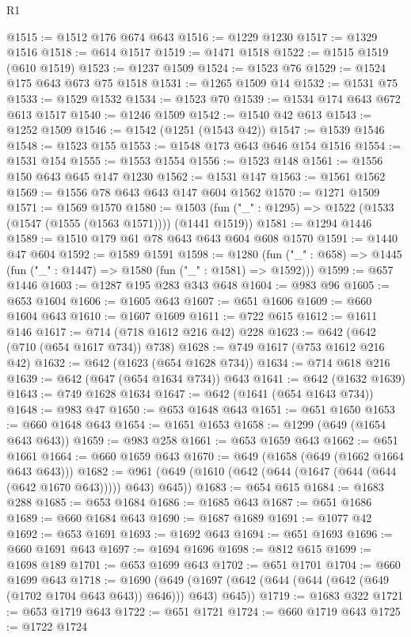 \begin{lexlean}{R1}
\begin{coremodule}
@1515 := @1512 @176 @674 @643
@1516 := @1229 @1230
@1517 := @1329 @1516
@1518 := @614 @1517
@1519 := @1471 @1518
@1522 := @1515 @1519 (@610 @1519)
@1523 := @1237 @1509
@1524 := @1523 @76
@1529 := @1524 @175 @643 @673 @75 @1518
@1531 := @1265 @1509 @14
@1532 := @1531 @75
@1533 := @1529 @1532
@1534 := @1523 @70
@1539 := @1534 @174 @643 @672 @613 @1517
@1540 := @1246 @1509
@1542 := @1540 @42 @613
@1543 := @1252 @1509
@1546 := @1542 (@1251 (@1543 @42))
@1547 := @1539 @1546
@1548 := @1523 @155
@1553 := @1548 @173 @643 @646 @154 @1516
@1554 := @1531 @154
@1555 := @1553 @1554
@1556 := @1523 @148
@1561 := @1556 @150 @643 @645 @147 @1230
@1562 := @1531 @147
@1563 := @1561 @1562
@1569 := @1556 @78 @643 @643 @147 @604 @1562
@1570 := @1271 @1509
@1571 := @1569 @1570
@1580 := @1503 (fun ("_" : @1295) => @1522 (@1533 (@1547 (@1555 (@1563 @1571)))) (@1441 @1519))
@1581 := @1294 @1446
@1589 := @1510 @179 @61 @78 @643 @643 @604 @608 @1570
@1591 := @1440 @47 @604
@1592 := @1589 @1591
@1598 := @1280 (fun ("_" : @658) => @1445 (fun ("_" : @1447) => @1580 (fun ("_" : @1581) => @1592)))
@1599 := @657 @1446
@1603 := @1287 @195 @283 @343 @648
@1604 := @983 @96
@1605 := @653 @1604
@1606 := @1605 @643
@1607 := @651 @1606
@1609 := @660 @1604 @643
@1610 := @1607 @1609
@1611 := @722 @615
@1612 := @1611 @146
@1617 := @714 (@718 @1612 @216 @42) @228
@1623 := @642 (@642 (@710 (@654 @1617 @734)) @738)
@1628 := @749 @1617 (@753 @1612 @216 @42)
@1632 := @642 (@1623 (@654 @1628 @734))
@1634 := @714 @618 @216
@1639 := @642 (@647 (@654 @1634 @734)) @643
@1641 := @642 (@1632 @1639)
@1643 := @749 @1628 @1634
@1647 := @642 (@1641 (@654 @1643 @734))
@1648 := @983 @47
@1650 := @653 @1648 @643
@1651 := @651 @1650
@1653 := @660 @1648 @643
@1654 := @1651 @1653
@1658 := @1299 (@649 (@1654 @643 @643))
@1659 := @983 @258
@1661 := @653 @1659 @643
@1662 := @651 @1661
@1664 := @660 @1659 @643
@1670 := @649 (@1658 (@649 (@1662 @1664 @643 @643)))
@1682 := @961 (@649 (@1610 (@642 (@644 (@1647 (@644 (@644 (@642 @1670 @643))))) @643) @645))
@1683 := @654 @615
@1684 := @1683 @288
@1685 := @653 @1684
@1686 := @1685 @643
@1687 := @651 @1686
@1689 := @660 @1684 @643
@1690 := @1687 @1689
@1691 := @1077 @42
@1692 := @653 @1691
@1693 := @1692 @643
@1694 := @651 @1693
@1696 := @660 @1691 @643
@1697 := @1694 @1696
@1698 := @812 @615
@1699 := @1698 @189
@1701 := @653 @1699 @643
@1702 := @651 @1701
@1704 := @660 @1699 @643
@1718 := @1690
    (@649 (@1697 (@642 (@644 (@644 (@642 (@649 (@1702 @1704 @643 @643)) @646))) @643) @645))
@1719 := @1683 @322
@1721 := @653 @1719 @643
@1722 := @651 @1721
@1724 := @660 @1719 @643
@1725 := @1722 @1724

\end{coremodule}
\end{lexlean}
